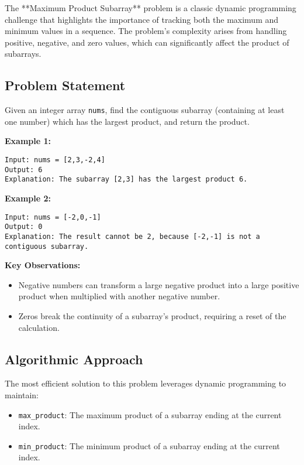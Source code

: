 \label{problem:Maximum_Product_Subarray}

The **Maximum Product Subarray** problem is a classic dynamic programming challenge that highlights the importance of tracking both the maximum and minimum values in a sequence. The problem’s complexity arises from handling positive, negative, and zero values, which can significantly affect the product of subarrays.

\subsection*{Problem Statement}
Given an integer array \texttt{nums}, find the contiguous subarray (containing at least one number) which has the largest product, and return the product.

\textbf{Example 1:}
\begin{verbatim}
Input: nums = [2,3,-2,4]
Output: 6
Explanation: The subarray [2,3] has the largest product 6.
\end{verbatim}

\textbf{Example 2:}
\begin{verbatim}
Input: nums = [-2,0,-1]
Output: 0
Explanation: The result cannot be 2, because [-2,-1] is not a contiguous subarray.
\end{verbatim}

\textbf{Key Observations:}
\begin{itemize}
    \item Negative numbers can transform a large negative product into a large positive product when multiplied with another negative number.
    \item Zeros break the continuity of a subarray’s product, requiring a reset of the calculation.
\end{itemize}

\subsection*{Algorithmic Approach}
The most efficient solution to this problem leverages dynamic programming to maintain:
\begin{itemize}
    \item \texttt{max\_product}: The maximum product of a subarray ending at the current index.
    \item \texttt{min\_product}: The minimum product of a subarray ending at the current index.
\end{itemize}

